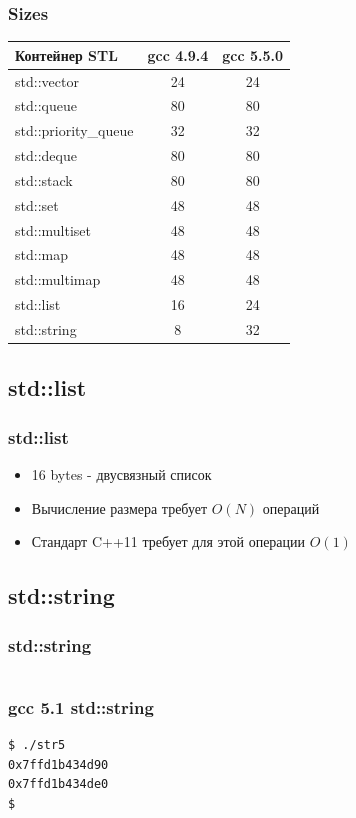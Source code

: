 \documentclass{beamer}
\begin{document}
\begin{frame}[fragile]
\frametitle{Sizes}
\begin{longtable}{|l|c|c|}
\hline
Контейнер STL & gcc 4.9.4 & gcc 5.5.0 \\
\hline
std::vector & 24 & 24 \\
std::queue & 80 & 80 \\
std::priority\_queue & 32 & 32 \\
std::deque & 80 & 80 \\
std::stack & 80 & 80 \\
std::set & 48 & 48 \\
std::multiset & 48 & 48 \\
std::map & 48 & 48 \\
std::multimap & 48 & 48 \\
std::list & 16 & 24 \\
std::string & 8 & 32 \\
\hline
\end{longtable}
\end{frame}

\subsection*{std::list}

\begin{frame}[fragile]
\frametitle{std::list}
\begin{itemize}
\item 16 bytes - двусвязный список
\item Вычисление размера требует $O(N)$ операций
\item Стандарт C++11 требует для этой операции $O(1)$
\end{itemize}
\end{frame}

\subsection*{std::string}

\begin{frame}[fragile]
\frametitle{std::string}
\inputminted{c++}{../src/str.cpp}
\end{frame}

\begin{frame}[fragile]
\frametitle{gcc 5.1 std::string}
\begin{verbatim}
$ ./str5
0x7ffd1b434d90
0x7ffd1b434de0
$
\end{verbatim}
\end{frame}
\end{document}
